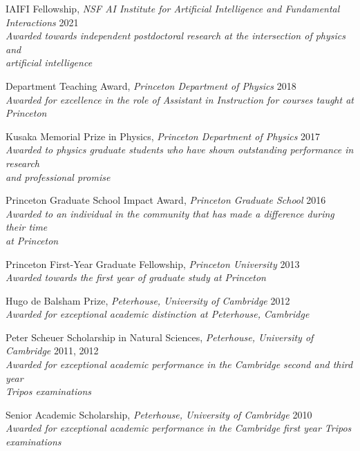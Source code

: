 \documentclass[letterpaper,11pt]{article}
\newenvironment{packed_itemize}{
\begin{itemize}[label=\raisebox{0.25ex}{\tiny$\bullet$}]
  \setlength{\itemsep}{3.9pt}
  \setlength{\parskip}{0pt}
  \setlength{\parsep}{0pt}}{\end{itemize}
}
\begin{document}
\begin{packed_itemize}
  \item IAIFI Fellowship, \emph{NSF AI Institute for Artificial Intelligence and Fundamental Interactions} \hfill 2021 \\ \emph{Awarded towards independent postdoctoral research at the intersection of physics and \\ artificial intelligence}
  \item Department Teaching Award, \emph{Princeton Department of Physics}  \hfill 2018 \\ \emph{Awarded for excellence in the role of Assistant in Instruction for courses taught at Princeton}
  \item Kusaka Memorial Prize in Physics, \emph{Princeton Department of Physics} \hfill 2017 \\ \emph{Awarded to physics graduate students who have shown outstanding performance in research \\ and professional promise}
  \item Princeton Graduate School Impact Award, \emph{Princeton Graduate School} \hfill 2016 \\ \emph{Awarded to an individual in the community that has made a difference during their time \\ at Princeton}
  \item Princeton First-Year Graduate Fellowship, \emph{Princeton University} \hfill 2013 \\ \emph{Awarded towards the first year of graduate study at Princeton}
  \item Hugo de Balsham Prize, \emph{Peterhouse, University of Cambridge}  \hfill 2012 \\ \emph{Awarded for exceptional academic distinction at Peterhouse, Cambridge}
  \item Peter Scheuer Scholarship in Natural Sciences, \emph{Peterhouse, University of Cambridge} \hfill 2011, 2012 \\ \emph{Awarded for exceptional academic performance in the Cambridge second and third year \\ Tripos examinations}
  \item Senior Academic Scholarship, \emph{Peterhouse, University of Cambridge} \hfill 2010\\ \emph{Awarded for exceptional academic performance in the Cambridge first year Tripos examinations}
\end{packed_itemize}
\vspace{2.0mm}
\end{document}
